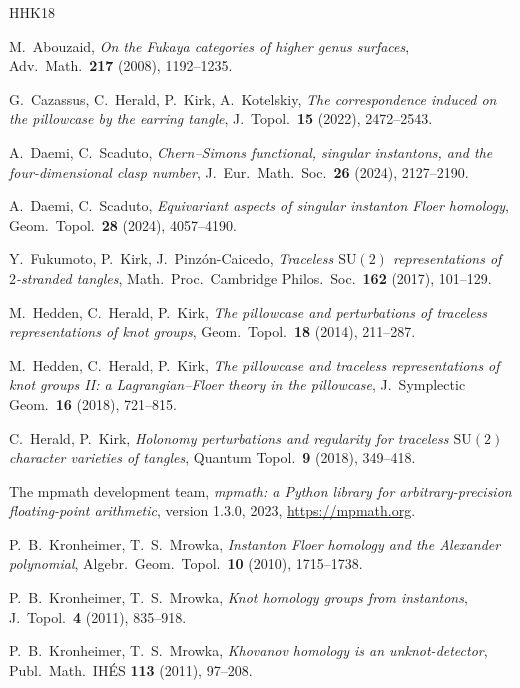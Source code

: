 \documentclass[11pt,reqno]{amsart}
\theoremstyle{plain}
\theoremstyle{definition}
\numberwithin{equation}{section}
\begin{document}
\begin{thebibliography}{HHK18}

 M.~Abouzaid, \emph{On the Fukaya categories of higher genus surfaces}, Adv.\
Math.\ \textbf{217} (2008), 1192--1235.

 G.~Cazassus, C.~Herald, P.~Kirk, A.~Kotelskiy, \emph{The correspondence induced on
the pillowcase by the earring tangle}, J.\ Topol.\ \textbf{15} (2022), 2472--2543.

 A.~Daemi, C.~Scaduto, \emph{Chern--Simons functional, singular instantons, and
the four-dimensional clasp number}, J.\ Eur.\ Math.\ Soc.\ \textbf{26} (2024), 2127--2190.

 A.~Daemi, C.~Scaduto, \emph{Equivariant aspects of singular instanton Floer
homology}, Geom.\ Topol.\ \textbf{28} (2024), 4057--4190.

 Y.~Fukumoto, P.~Kirk, J.~Pinz\'on-Caicedo, \emph{Traceless $\mathrm{SU}(2)$
representations of $2$-stranded tangles}, Math.\ Proc.\ Cambridge Philos.\ Soc.\ \textbf{162} (2017),
101--129.

 M.~Hedden, C.~Herald, P.~Kirk, \emph{The pillowcase and perturbations of traceless
representations of knot groups}, Geom.\ Topol.\ \textbf{18} (2014), 211--287.

 M.~Hedden, C.~Herald, P.~Kirk, \emph{The pillowcase and traceless representations of
knot groups II: a Lagrangian--Floer theory in the pillowcase}, J.\ Symplectic Geom.\ \textbf{16} (2018),
721--815.

 C.~Herald, P.~Kirk, \emph{Holonomy perturbations and regularity for traceless
$\mathrm{SU}(2)$ character varieties of tangles}, Quantum Topol.\ \textbf{9} (2018), 349--418.

 The mpmath development team, \emph{mpmath: a Python library for arbitrary-precision
floating-point arithmetic}, version 1.3.0, 2023, \url{https://mpmath.org}.

 P.~B.~Kronheimer, T.~S.~Mrowka, \emph{Instanton Floer homology and the
Alexander polynomial}, Algebr.\ Geom.\ Topol.\ \textbf{10} (2010), 1715--1738.

 P.~B.~Kronheimer, T.~S.~Mrowka, \emph{Knot homology groups from instantons}, J.\
Topol.\ \textbf{4} (2011), 835--918.

 P.~B.~Kronheimer, T.~S.~Mrowka, \emph{Khovanov homology is an unknot-detector},
Publ.\ Math.\ IH\'ES \textbf{113} (2011), 97--208.


\end{thebibliography}
\end{document}
